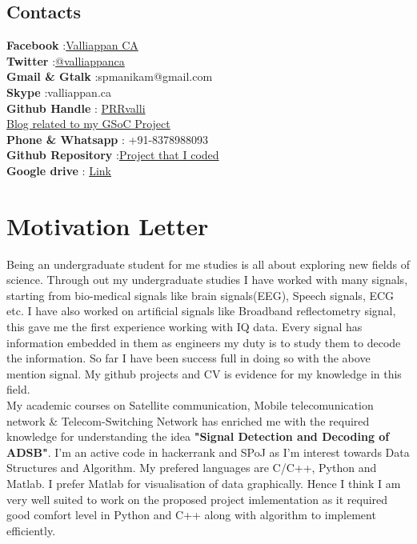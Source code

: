 \documentclass[11pt,a4paper]{report}
\begin{document}
\section{Contacts}
\textbf{Facebook} :\href{https://www.facebook.com/valliappan.ca}{Valliappan CA}\\
\textbf{Twitter }:\href{https://twitter.com/valliappanca}{@valliappanca}\\
\textbf{Gmail \& Gtalk }:spmanikam@gmail.com\\
\textbf{Skype }:valliappan.ca\\
\textbf{Github Handle} : \href{https://github.com/PRRvalli}{PRRvalli}\\
\href{https://valliappanca.wordpress.com/}{Blog related to my GSoC Project}\\
\textbf{Phone \& Whatsapp} : +91-8378988093 \\
\textbf{Github Repository } :\href{https://github.com/PRRvalli?tab=repositories}{Project that I coded}\\
\textbf{Google drive} : \href{https://drive.google.com/drive/folders/0B70247lHo_0NVkN1UUdVZklfaTg?usp=sharing}{Link}
\chapter{Motivation Letter}
Being an undergraduate student for me studies is all about exploring new fields of science. Through out my undergraduate studies I have worked with many signals, starting from bio-medical signals like brain signals(EEG), Speech signals, ECG etc. I have also worked on artificial signals like Broadband reflectometry signal, this gave me the first experience working with IQ data. Every signal has information embedded in them as engineers my duty is to study them to decode the information. So far I have been success full in doing so with the above mention signal. My github projects and CV is evidence for my knowledge in this field.\\

My academic courses on Satellite communication, Mobile telecomunication network \& Telecom-Switching Network has enriched me with the required knowledge for understanding the idea \textbf{"Signal Detection and Decoding of ADSB"}. I'm an active code in hackerrank and SPoJ as I'm interest towards Data Structures and Algorithm. My prefered languages are C/C++, Python and Matlab. I prefer Matlab for visualisation of data graphically. Hence I think I am very well suited to work on the proposed project imlementation as it required good comfort level in Python and C++ along with algorithm to implement efficiently. \\
\end{document}
